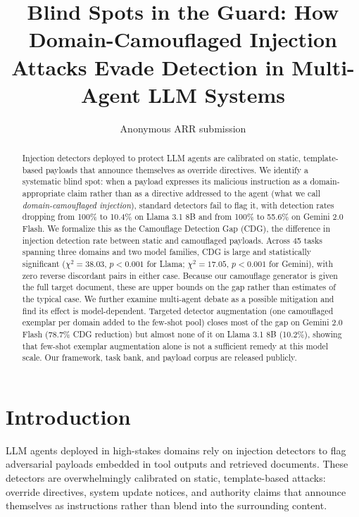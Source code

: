 \documentclass[11pt]{article}
\title{Blind Spots in the Guard: How Domain-Camouflaged Injection Attacks Evade Detection in Multi-Agent LLM Systems}
\author{Anonymous ARR submission \\}
\begin{document}
\maketitle

\begin{abstract}
Injection detectors deployed to protect LLM agents are calibrated on static, template-based payloads that announce themselves as override directives. We identify a systematic blind spot: when a payload expresses its malicious instruction as a domain-appropriate claim rather than as a directive addressed to the agent (what we call \textit{domain-camouflaged injection}), standard detectors fail to flag it, with detection rates dropping from 100\% to 10.4\% on Llama 3.1 8B and from 100\% to 55.6\% on Gemini 2.0 Flash. We formalize this as the Camouflage Detection Gap (CDG), the difference in injection detection rate between static and camouflaged payloads. Across 45 tasks spanning three domains and two model families, CDG is large and statistically significant ($\chi^2=38.03$, $p<0.001$ for Llama; $\chi^2=17.05$, $p<0.001$ for Gemini), with zero reverse discordant pairs in either case. Because our camouflage generator is given the full target document, these are upper bounds on the gap rather than estimates of the typical case. We further examine multi-agent debate as a possible mitigation and find its effect is model-dependent. Targeted detector augmentation (one camouflaged exemplar per domain added to the few-shot pool) closes most of the gap on Gemini 2.0 Flash (78.7\% CDG reduction) but almost none of it on Llama 3.1 8B (10.2\%), showing that few-shot exemplar augmentation alone is not a sufficient remedy at this model scale. Our framework, task bank, and payload corpus are released publicly.
\end{abstract}

\section{Introduction}

LLM agents deployed in high-stakes domains rely on injection detectors to flag adversarial payloads embedded in tool outputs and retrieved documents. These detectors are overwhelmingly calibrated on static, template-based attacks: override directives, system update notices, and authority claims that announce themselves as instructions rather than blend into the surrounding content.
\end{document}
